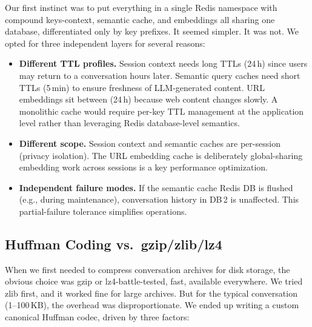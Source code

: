 \documentclass[conference]{IEEEtran}
\begin{document}
Our first instinct was to put everything in a single Redis namespace with compound keys-context, semantic cache, and embeddings all sharing one database, differentiated only by key prefixes. It seemed simpler. It was not. We opted for three independent layers for several reasons:

\begin{itemize}
\item \textbf{Different TTL profiles.} Session context needs long TTLs (24\,h) since users may return to a conversation hours later. Semantic query caches need short TTLs (5\,min) to ensure freshness of LLM-generated content. URL embeddings sit between (24\,h) because web content changes slowly. A monolithic cache would require per-key TTL management at the application level rather than leveraging Redis database-level semantics.

\item \textbf{Different scope.} Session context and semantic caches are per-session (privacy isolation). The URL embedding cache is deliberately global-sharing embedding work across sessions is a key performance optimization.

\item \textbf{Independent failure modes.} If the semantic cache Redis DB is flushed (e.g., during maintenance), conversation history in DB\,2 is unaffected. This partial-failure tolerance simplifies operations.
\end{itemize}

\subsection{Huffman Coding vs.\ gzip/zlib/lz4}

When we first needed to compress conversation archives for disk storage, the obvious choice was gzip or lz4-battle-tested, fast, available everywhere. We tried zlib first, and it worked fine for large archives. But for the typical conversation (1--100\,KB), the overhead was disproportionate. We ended up writing a custom canonical Huffman codec, driven by three factors:
\end{document}
